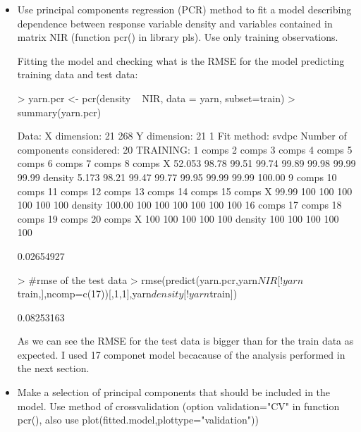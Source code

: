\documentclass[a4paper]{article}
\begin{document}
\begin{itemize}
\item Use principal components regression (PCR) method to fit a model describing
dependence between response variable density and variables contained in matrix NIR (function pcr() in library pls). Use only training observations.

Fitting the model and checking what is the RMSE for the model predicting
training data and test data: 
\begin{Schunk}
\begin{Sinput}
> yarn.pcr <- pcr(density ~ NIR, data = yarn, subset=train)
> summary(yarn.pcr)
\end{Sinput}
\begin{Soutput}
Data: 	X dimension: 21 268 
	Y dimension: 21 1
Fit method: svdpc
Number of components considered: 20
TRAINING: % variance explained
         1 comps  2 comps  3 comps  4 comps  5 comps  6 comps  7 comps  8 comps
X         52.053    98.78    99.51    99.74    99.89    99.98    99.99    99.99
density    5.173    98.21    99.47    99.77    99.95    99.99    99.99   100.00
         9 comps  10 comps  11 comps  12 comps  13 comps  14 comps  15 comps
X          99.99       100       100       100       100       100       100
density   100.00       100       100       100       100       100       100
         16 comps  17 comps  18 comps  19 comps  20 comps
X             100       100       100       100       100
density       100       100       100       100       100
\end{Soutput}
\begin{Soutput}
[1] 0.02654927
\end{Soutput}
\begin{Sinput}
> #rmse of the test data
> rmse(predict(yarn.pcr,yarn$NIR[!yarn$train,],ncomp=c(17))[,1,1],yarn$density[!yarn$train])
\end{Sinput}
\begin{Soutput}
[1] 0.08253163
\end{Soutput}
\end{Schunk}
As we can see the RMSE for the test data is bigger than for the train data as
expected. I used 17 componet model becacause of the analysis performed in the
next section.
\item Make a selection of principal components that should be included in the
model. Use method of crossvalidation (option validation="CV" in function pcr(), also use plot(fitted.model,plottype="validation"))


\end{itemize}
\end{document}
